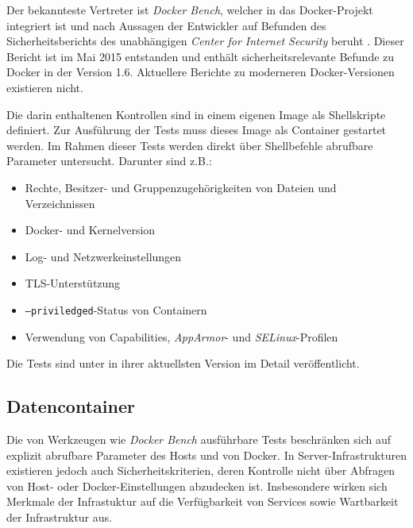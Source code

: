 \documentclass[../main.tex]{subfiles}
\begin{document}
    Der bekannteste Vertreter ist \emph{Docker Bench}, welcher in das Docker-Projekt integriert ist und nach Aussagen der Entwickler auf Befunden des Sicherheitsberichts des unabhängigen \emph{Center for Internet Security} \cite{https://benchmarks.cisecurity.org/tools2/docker/CIS_Docker_1.6_Benchmark_v1.0.0.pdf} beruht \cite{https://github.com/docker/docker-bench-security}. Dieser Bericht ist im Mai 2015 entstanden und enthält sicherheitsrelevante Befunde zu Docker in der Version 1.6. Aktuellere Berichte zu moderneren Docker-Versionen existieren nicht.

    Die darin enthaltenen Kontrollen sind in einem eigenen Image als Shellskripte definiert. Zur Ausführung der Tests muss dieses Image als Container gestartet werden. Im Rahmen dieser Tests werden direkt über Shellbefehle abrufbare Parameter untersucht. Darunter sind z.B.:

    \begin{itemize}
      \item Rechte, Besitzer- und Gruppenzugehörigkeiten von Dateien und Verzeichnissen
      \item Docker- und Kernelversion
      \item Log- und Netzwerkeinstellungen
      \item TLS-Unterstützung
      \item \texttt{--priviledged}-Status von Containern
      \item Verwendung von Capabilities, \emph{AppArmor}- und \emph{SELinux}-Profilen
    \end{itemize}

    Die Tests sind unter \cite{https://github.com/docker/docker-bench-security/tree/master/tests} in ihrer aktuellsten Version im Detail veröffentlicht.

    \subsection{Datencontainer}
      Die von Werkzeugen wie \emph{Docker Bench} ausführbare Tests beschränken sich auf explizit abrufbare Parameter des Hosts und von Docker. In Server-Infrastrukturen existieren jedoch auch Sicherheitskriterien, deren Kontrolle nicht über Abfragen von Host- oder Docker-Einstellungen abzudecken ist. Insbesondere wirken sich Merkmale der Infrastuktur auf die Verfügbarkeit von Services sowie Wartbarkeit der Infrastruktur aus.
\end{document}
